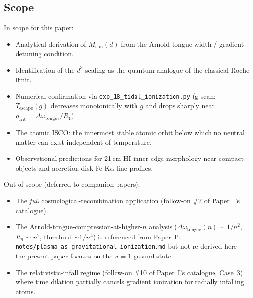 
\label{sec:introduction}


\subsection{Scope}
\label{subsec:scope}

In scope for this paper:

\begin{itemize}
\item Analytical derivation of $M_\text{min}(d)$ from the
      Arnold-tongue-width / gradient-detuning condition.
\item Identification of the $d^3$ scaling as the quantum analogue
      of the classical Roche limit.
\item Numerical confirmation via \texttt{exp\_18\_tidal\_ionization.py}
      (g-scan: $T_\text{escape}(g)$ decreases monotonically with $g$
      and drops sharply near $g_\text{crit} = \Delta\omega_\text{tongue}
      / R_1$).
\item The atomic ISCO: the innermost stable atomic orbit below
      which no neutral matter can exist independent of temperature.
\item Observational predictions for 21\,cm HI inner-edge morphology
      near compact objects and accretion-disk Fe K$\alpha$ line
      profiles.
\end{itemize}

Out of scope (deferred to companion papers):

\begin{itemize}
\item The \emph{full} cosmological-recombination application
      (follow-on \#2 of Paper~I's catalogue).
\item The Arnold-tongue-compression-at-higher-$n$ analysis
      ($\Delta\omega_\text{tongue}(n) \sim 1/n^2$,
      $R_n \sim n^2$, threshold $\sim 1/n^4$) is referenced from
      Paper~I's \texttt{notes/plasma\_as\_gravitational\_ionization.md}
      but not re-derived here -- the present paper focuses on the
      $n=1$ ground state.
\item The relativistic-infall regime (follow-on \#10 of Paper~I's
      catalogue, Case~3) where time dilation partially cancels
      gradient ionization for radially infalling atoms.
\end{itemize}

